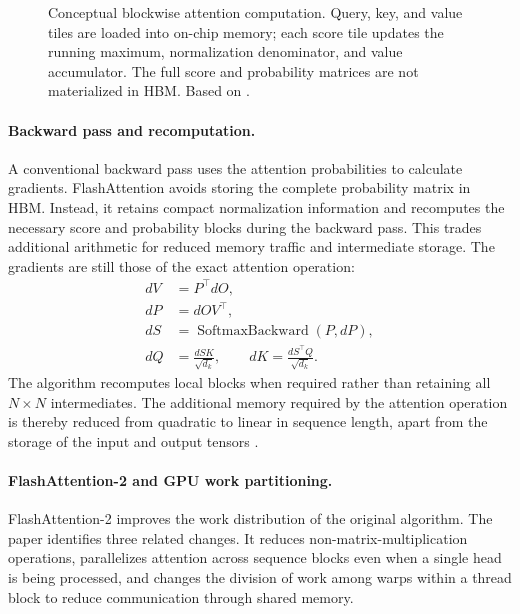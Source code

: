\begin{figure}[htbp]
    \centering
    
    \caption{Conceptual blockwise attention computation. Query, key, and
    value tiles are loaded into on-chip memory; each score tile updates
    the running maximum, normalization denominator, and value accumulator.
    The full score and probability matrices are not materialized in HBM.
    Based on \textcite{dao2023flashattention2}.}
    \label{fig:attn-flash-tiling}
\end{figure}

\paragraph{Backward pass and recomputation.}
A conventional backward pass uses the attention probabilities to calculate
gradients. FlashAttention avoids storing the complete probability matrix
in HBM. Instead, it retains compact normalization information and
recomputes the necessary score and probability blocks during the backward
pass. This trades additional arithmetic for reduced memory traffic and
intermediate storage. The gradients are still those of the exact attention
operation:
\begin{align}
    dV&=P^\top dO,
    \label{eq:attn-flash-backward-dv}\\
    dP&=dOV^\top,
    \label{eq:attn-flash-backward-dp}\\
    dS&=\operatorname{SoftmaxBackward}(P,dP),
    \label{eq:attn-flash-backward-ds}\\
    dQ&=\frac{dSK}{\sqrt{d_k}},
    \qquad
    dK=\frac{dS^\top Q}{\sqrt{d_k}}.
    \label{eq:attn-flash-backward-dqdk}
\end{align}
The algorithm recomputes local blocks when required rather than retaining
all \(N\times N\) intermediates. The additional memory required by the
attention operation is thereby reduced from quadratic to linear in
sequence length, apart from the storage of the input and output tensors
\parencite{dao2023flashattention2}.

\paragraph{FlashAttention-2 and GPU work partitioning.}
FlashAttention-2 improves the work distribution of the original
algorithm. The paper identifies three related changes. It reduces
non-matrix-multiplication operations, parallelizes attention across
sequence blocks even when a single head is being processed, and changes
the division of work among warps within a thread block to reduce
communication through shared memory.

